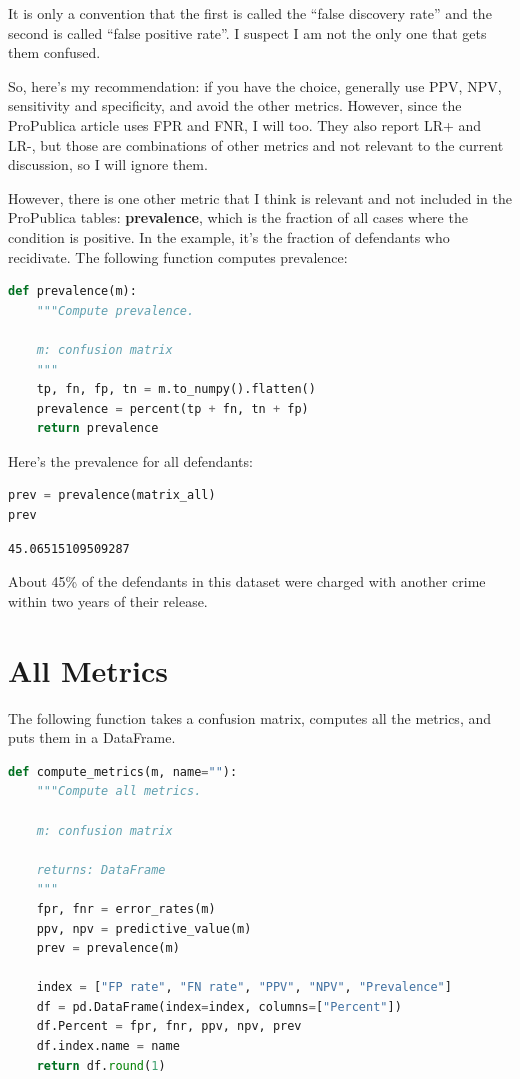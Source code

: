 It is only a convention that the first is called the ``false discovery
rate'' and the second is called ``false positive rate''. I suspect I am
not the only one that gets them confused.

So, here's my recommendation: if you have the choice, generally use PPV,
NPV, sensitivity and specificity, and avoid the other metrics. However,
since the ProPublica article uses FPR and FNR, I will too. They also
report LR+ and LR-, but those are combinations of other metrics and not
relevant to the current discussion, so I will ignore them.

However, there is one other metric that I think is relevant and not
included in the ProPublica tables: \textbf{prevalence}, which is the
fraction of all cases where the condition is positive. In the example,
it's the fraction of defendants who recidivate. The following function
computes prevalence:

\begin{lstlisting}[language=Python,style=source]
def prevalence(m):
    """Compute prevalence.

    m: confusion matrix
    """
    tp, fn, fp, tn = m.to_numpy().flatten()
    prevalence = percent(tp + fn, tn + fp)
    return prevalence
\end{lstlisting}

Here's the prevalence for all defendants:

\begin{lstlisting}[language=Python,style=source]
prev = prevalence(matrix_all)
prev
\end{lstlisting}

\begin{lstlisting}[style=output]
45.06515109509287
\end{lstlisting}

About 45\% of the defendants in this dataset were charged with another
crime within two years of their release.

\section{All Metrics}\label{all-metrics}

The following function takes a confusion matrix, computes all the
metrics, and puts them in a DataFrame.

\begin{lstlisting}[language=Python,style=source]
def compute_metrics(m, name=""):
    """Compute all metrics.

    m: confusion matrix

    returns: DataFrame
    """
    fpr, fnr = error_rates(m)
    ppv, npv = predictive_value(m)
    prev = prevalence(m)

    index = ["FP rate", "FN rate", "PPV", "NPV", "Prevalence"]
    df = pd.DataFrame(index=index, columns=["Percent"])
    df.Percent = fpr, fnr, ppv, npv, prev
    df.index.name = name
    return df.round(1)
\end{lstlisting}

